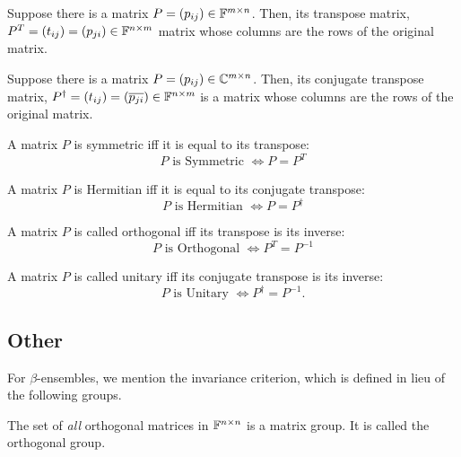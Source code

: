 \begin{definition}
Suppose there is a matrix $P = (p_{ij}) \in \mathbb{F}^{m\times n}$. Then, its transpose matrix, $P^{T} = (t_{ij}) = (p_{ji}) \in \mathbb{F}^{n\times m}$ matrix whose columns are the rows of the original matrix.
\end{definition}

\begin{definition}
Suppose there is a matrix $P = (p_{ij}) \in \mathbb{C}^{m\times n}$. Then, its conjugate transpose matrix, $P^{\dagger} = (t_{ij}) = (\overline{p_{ji}}) \in \mathbb{F}^{n\times m}$ is a matrix whose columns are the rows of the original matrix.
\end{definition}

\begin{definition}
A matrix $P$ is symmetric iff it is equal to its transpose:
$$P \text{ is Symmetric } \iff P = P^{T}$$
\end{definition}

\begin{definition}
A matrix $P$ is Hermitian iff it is equal to its conjugate transpose:
$$P \text{ is Hermitian } \iff P = P^{\dagger}$$
\end{definition}

\begin{definition}
A matrix $P$ is called orthogonal iff its transpose is its inverse:
$$P \text{ is Orthogonal } \iff P^{T} = P^{-1}$$
\end{definition}

\begin{definition}
A matrix $P$ is called unitary iff its conjugate transpose is its inverse:
$$ P \text{ is Unitary } \iff P^{\dagger} = P^{-1}. $$
\end{definition}


\subsection{Other}

\noindent For $\beta$-ensembles, we mention the invariance criterion, which is defined in lieu of the following groups.

\begin{theorem}
The set of {\em all} orthogonal matrices in $\mathbb{F}^{n\times n}$ is a matrix group. It is called the {orthogonal group}.
\end{theorem}

